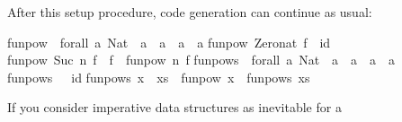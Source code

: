 \begin{isabellebody}
\begin{isamarkuptext}
  After this setup procedure, code generation can continue as usual:%
\end{isamarkuptext}%
\isamarkuptrue%
%
\isadelimquotetypewriter
%
\endisadelimquotetypewriter
%
\isatagquotetypewriter
%
\begin{isamarkuptext}%
funpow\ {}{}\ forall\ a{}\ Nat\ {}{}\ {}a\ {}{}\ a{}\ {}{}\ a\ {}{}\ a{}\isanewline
funpow\ Zero{}nat\ f\ {}\ id{}\isanewline
funpow\ {}Suc\ n{}\ f\ {}\ f\ {}\ funpow\ n\ f{}\isanewline
\isanewline
funpows\ {}{}\ forall\ a{}\ {}Nat{}\ {}{}\ {}a\ {}{}\ a{}\ {}{}\ a\ {}{}\ a{}\isanewline
funpows\ {}{}\ {}\ id{}\isanewline
funpows\ {}x\ {}\ xs{}\ {}\ funpow\ x\ {}\ funpows\ xs{}\isanewline%
\end{isamarkuptext}%
\isamarkuptrue%
%
\endisatagquotetypewriter
{\isafoldquotetypewriter}%
%
\isadelimquotetypewriter
%
\endisadelimquotetypewriter
%
\isamarkuptrue%
%
\begin{isamarkuptext}%
If you consider imperative data structures as inevitable for a

\end{isamarkuptext}
\end{isabellebody}
